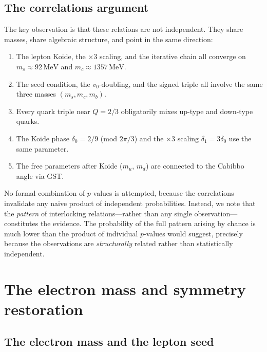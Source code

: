 \documentclass[12pt,a4paper]{article}
\newcommand{\MeV}{\,\text{MeV}}
\begin{document}
\subsection{The correlations argument}

The key observation is that these relations are not independent.
They share masses, share algebraic structure, and point in the
same direction:

\begin{enumerate}
\item The lepton Koide, the $\times 3$ scaling, and the iterative
chain all converge on $m_s \approx 92\MeV$ and $m_c \approx 1357\MeV$.

\item The seed condition, the $v_0$-doubling, and the signed triple
all involve the same three masses $(m_s, m_c, m_b)$.

\item Every quark triple near $Q = 2/3$ obligatorily mixes up-type
and down-type quarks.

\item The Koide phase $\delta_0 = 2/9$ (mod $2\pi/3$) and the
$\times 3$ scaling $\delta_1 = 3\delta_0$ use the same parameter.

\item The free parameters after Koide ($m_u$, $m_d$) are connected
to the Cabibbo angle via GST.
\end{enumerate}

No formal combination of $p$-values is attempted, because the
correlations invalidate any naive product of independent
probabilities. Instead, we note that the \emph{pattern} of
interlocking relations---rather than any single observation---constitutes
the evidence. The probability of the full pattern arising by
chance is much lower than the product of individual $p$-values
would suggest, precisely because the observations are
\emph{structurally} related rather than statistically independent.

\section{The electron mass and symmetry restoration}

\subsection{The electron mass and the lepton seed}
\end{document}
